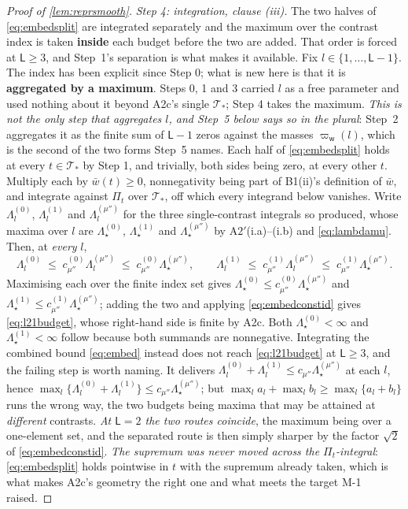 \begin{proof}[Proof of \cref{lem:reprsmooth}]
\emph{Step 4: integration, clause \textup{(iii)}.} The two halves of \eqref{eq:embedsplit} are
integrated separately and the maximum over the contrast index is taken \textbf{inside} each budget
before the two are added. That order is forced at $\mathsf L\ge3$, and Step~1's separation is what makes
it available. Fix $l\in\{1,\dots,\mathsf L-1\}$. The index has been explicit since Step 0; what is
new here is that it is \textbf{aggregated by a maximum}. Steps 0, 1 and 3
carried $l$ as a free parameter and used nothing about it beyond A2c's single $\mathcal T_\ast$; Step 4
takes the maximum. \emph{This is not the only step that aggregates $l$, and Step~5 below says so in
the plural}: Step~2 aggregates it as the finite sum of $\mathsf L-1$ zeros against the masses
$\varpi_{\mathsf w}(l)$, which is the second of the two forms Step~5 names. Each half of \eqref{eq:embedsplit} holds at every
$t\in\mathcal T_\ast$ by Step 1, and trivially, both sides being zero, at every other $t$. Multiply each
by $\bar w(t)\ge0$, nonnegativity being part of B1(ii)'s definition of $\bar w$, and integrate
against $\Pi_t$ over $\mathcal T_\ast$, off which every integrand below vanishes. Write
$\Lambda^{(0)}_l$, $\Lambda^{(1)}_l$ and $\Lambda^{(\mu'')}_l$ for the three single-contrast integrals so
produced, whose maxima over $l$ are $\Lambda^{(0)}_\star$, $\Lambda^{(1)}_\star$ and
$\Lambda^{(\mu'')}_\star$ by A$2'$(i.a)--(i.b) and \eqref{eq:lambdamu}. Then, at \emph{every} $l$,
\[
\Lambda^{(0)}_l\;\le\;c^{(0)}_{\mu''}\Lambda^{(\mu'')}_l\;\le\;c^{(0)}_{\mu''}\Lambda^{(\mu'')}_\star,
\qquad
\Lambda^{(1)}_l\;\le\;c^{(1)}_{\mu''}\Lambda^{(\mu'')}_l\;\le\;c^{(1)}_{\mu''}\Lambda^{(\mu'')}_\star .
\]
Maximising each over the finite index set gives
$\Lambda^{(0)}_\star\le c^{(0)}_{\mu''}\Lambda^{(\mu'')}_\star$ and
$\Lambda^{(1)}_\star\le c^{(1)}_{\mu''}\Lambda^{(\mu'')}_\star$; adding the two and applying
\eqref{eq:embedconstid} gives \eqref{eq:l21budget}, whose right-hand side is finite by A2c. Both
$\Lambda^{(0)}_\star<\infty$ and $\Lambda^{(1)}_\star<\infty$ follow because both summands are
nonnegative.
Integrating the combined bound \eqref{eq:embed} instead does not reach \eqref{eq:l21budget} at
$\mathsf L\ge3$, and the failing step is worth naming. It delivers
$\Lambda^{(0)}_l+\Lambda^{(1)}_l\le c_{\mu''}\Lambda^{(\mu'')}_\star$ at each $l$, hence
$\max_l\{\Lambda^{(0)}_l+\Lambda^{(1)}_l\}\le c_{\mu''}\Lambda^{(\mu'')}_\star$; but
$\max_la_l+\max_lb_l\ge\max_l\{a_l+b_l\}$ runs the wrong way, the two budgets being maxima that may be
attained at \emph{different} contrasts. \emph{At $\mathsf L=2$ the two routes coincide}, the maximum
being over a one-element set, and the separated route is then simply sharper by the factor $\sqrt2$
of \eqref{eq:embedconstid}. \emph{The supremum was never
moved across the $\Pi_t$-integral}: \eqref{eq:embedsplit} holds pointwise in $t$ with the supremum
already taken, which is what makes A2c's geometry the right one and what meets the target M-1 raised.


\end{proof}
